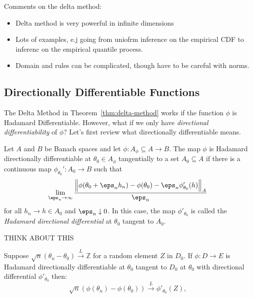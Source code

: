 \begin{remark*} Comments on the delta method:
	\begin{itemize}
		\item Delta method is very powerful in infinite dimensions
		\item Lots of examples, e.j going from uniofrm inference on the empirical CDF to inferenc on the empirical quantile process.
		\item Domain and rules can be complicated, though have to be careful with norms.
	\end{itemize}
\end{remark*}

\subsection{Directionally Differentiable Functions}%
\label{subsec:directionally-differentiable}

The Delta Method in Theorem~\ref{thm:delta-method} works if the function \(\phi\) is Hadamard Differentiable. However, what if we only have  \textit{directional differentiability} of \(\phi\)? Let's first review what directionally differentiable means. 
\begin{definition}
	\label{def:directional-hadamard}
	Let \(A\) and  \(B\) be Banach spaces and let  \(\phi: A_\phi \subseteq A \to B\). The map  \(\phi\) is Hadamard directionally differentiable at  \(\theta_0 \in A_{\phi}\) tangentially to a set  \(A_0 \subseteq A\) if there is a continuous map  \(\phi_{\theta_0}':A_0\to B\) such that 
	\begin{equation}
		\label{eq:directional-hadamard}
		\lim_{\eps_n\to \infty}\frac{\left\|\phi(\theta_0 + \eps_n h_n)-\phi(\theta_0) - \eps_n\phi_{\theta_0}'(h)\right\|_A}{\eps_n} 
	\end{equation}
	for all \(h_n \to h\in A_0\) and \(\eps_n\downarrow 0\). In this case, the map \(\phi'_{\theta_0}\) is called the \textit{Hadamard directional differential} at \(\theta_0\) tangent to \(A_0\).
\end{definition}
\begin{remark}
	THINK ABOUT THIS	
\end{remark}
\begin{theorem}
	\label{thm:directional-delta-method}
	Suppose \(\sqrt{n}\left(\theta_n - \theta_0\right)\overset{L}{\to}\mathbb{Z}\) for a random element \(Z\) in \(D_0\). If \(\phi:D\to E\) is Hadamard directionally differentiable at \(\theta_0\) tangent to \(D_0\) at \(\theta_0\) with  directional differential \(\phi'_{\theta_0}\) then:
	 \[
		 \sqrt{n}\left(\phi(\theta_n) - \phi(\theta_0)\right)\overset{L}{\to} \phi'_{\theta_0}(Z)
	,\] 
\end{theorem}

